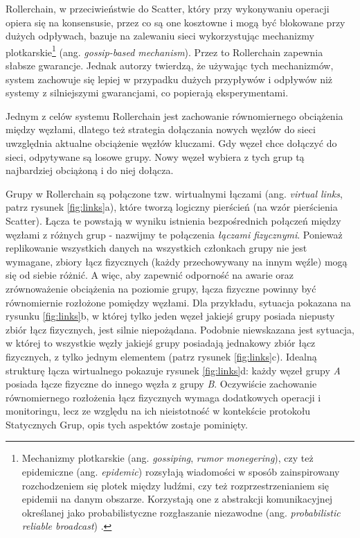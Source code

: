 \documentclass[12pt, twoside, openany]{report}
\begin{document}
Rollerchain, w przeciwieństwie do Scatter, który przy wykonywaniu operacji opiera się na konsensusie, przez co są one kosztowne i mogą być blokowane przy dużych odpływach, bazuje na zalewaniu sieci wykorzystując mechanizmy plotkarskie\footnote{Mechanizmy plotkarskie (ang. \textit{gossiping}, \textit{rumor monegering}), czy też epidemiczne (ang. \textit{epidemic}) rozsyłają wiadomości w sposób zainspirowany rozchodzeniem się plotek między ludźmi, czy też rozprzestrzenianiem się epidemii na danym obszarze. Korzystają one z abstrakcji komunikacyjnej określanej jako probabilistyczne rozgłaszanie niezawodne (ang. \textit{probabilistic reliable broadcast}) \cite{bib:pr}.} (ang. \textit{gossip-based mechanism}). Przez to Rollerchain zapewnia słabsze gwarancje. Jednak autorzy twierdzą, że używając tych mechanizmów, system zachowuje się lepiej w przypadku dużych przypływów i odpływów niż systemy z silniejszymi gwarancjami, co popierają eksperymentami.

Jednym z celów systemu Rollerchain jest zachowanie równomiernego obciążenia między węzłami, dlatego też strategia dołączania nowych węzłów do sieci uwzględnia aktualne obciążenie węzłów kluczami. Gdy węzeł chce dołączyć do sieci, odpytywane są losowe grupy. Nowy węzeł wybiera z tych grup tą najbardziej obciążoną i do niej dołącza.

Grupy w Rollerchain są połączone tzw. wirtualnymi łączami (ang. \textit{virtual links}, patrz rysunek \ref{fig:links}a), które tworzą logiczny pierścień (na wzór pierścienia Scatter). Łącza te powstają w wyniku istnienia bezpośrednich połączeń między węzłami z różnych grup - nazwijmy te połączenia \textit{łączami fizycznymi}. Ponieważ replikowanie wszystkich danych na wszystkich członkach grupy nie jest wymagane, zbiory łącz fizycznych (każdy przechowywany na innym węźle) mogą się od siebie różnić. A więc, aby zapewnić odporność na awarie oraz zrównoważenie obciążenia na poziomie grupy, łącza fizyczne powinny być równomiernie rozłożone pomiędzy węzłami. Dla przykładu, sytuacja pokazana na rysunku \ref{fig:links}b, w której tylko jeden węzeł jakiejś grupy posiada niepusty zbiór łącz fizycznych, jest silnie niepożądana. Podobnie niewskazana jest sytuacja, w której to wszystkie węzły jakiejś grupy posiadają jednakowy zbiór łącz fizycznych, z tylko jednym elementem (patrz rysunek \ref{fig:links}c). Idealną strukturę łącza wirtualnego pokazuje rysunek \ref{fig:links}d: każdy węzeł grupy \textit{A} posiada łącze fizyczne do innego węzła z grupy \textit{B}. Oczywiście zachowanie równomiernego rozłożenia łącz fizycznych wymaga dodatkowych operacji i monitoringu, lecz ze względu na ich nieistotność w kontekście protokołu Statycznych Grup, opis tych aspektów zostaje pominięty.
\end{document}
